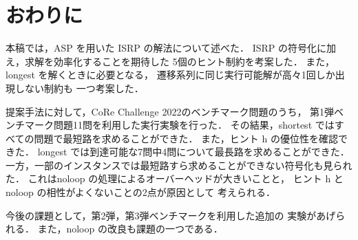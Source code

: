 \section{おわりに}\label{sec:conclusion}
本稿では，ASP を用いた ISRP の解法について述べた．
ISRP の符号化に加え，求解を効率化することを期待した
5個のヒント制約を考案した．
また，longest を解くときに必要となる，
遷移系列に同じ実行可能解が高々1回しか出現しない制約も
一つ考案した．

提案手法に対して，CoRe Challenge 2022のベンチマーク問題のうち，
第1弾ベンチマーク問題11問を利用した実行実験を行った．
その結果，shortest ではすべての問題で最短路を求めることができた．
また，ヒント h の優位性を確認できた．
longest では到達可能な7問中4問について最長路を求めることができた．
一方，一部のインスタンスでは最短路すら求めることができない符号化も見られた．
これはnoloop の処理によるオーバーヘッドが大きいことと，
ヒント h と noloop の相性がよくないことの2点が原因として
考えられる．

今後の課題として，第2弾，第3弾ベンチマークを利用した追加の
実験があげられる．
また，noloop の改良も課題の一つである．